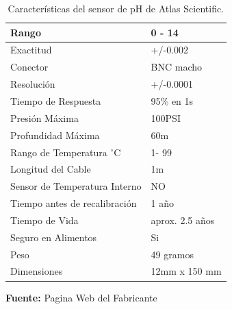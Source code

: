 \begin{table}[H]
\protect\caption[Características del sensor de pH de Atlas Scientific]{Características del sensor de pH de Atlas Scientific.}
\label{tab: caract_sondaph}
\begin{center}
\begin{tabular}{|l|l|}
\hline
Rango    &  0 - 14\\
\hline
Exactitud      &  +/-0.002\\
\hline
Conector &  BNC macho\\
\hline
Resolución   &  +/-0.0001\\
\hline
Tiempo de Respuesta   &  95\% en 1s\\
\hline
Presión Máxima    &  100PSI\\
\hline
Profundidad Máxima	& 60m\\
\hline
Rango de Temperatura $^{\circ}$C	& 1- 99\\
\hline
Longitud del Cable	& 1m\\
\hline
Sensor de Temperatura Interno	& NO\\
\hline
Tiempo antes de recalibración	& 1 año\\
\hline
Tiempo de Vida	& aprox. 2.5 años\\
\hline
Seguro en Alimentos & Si\\
\hline
Peso & 49 gramos\\
\hline
Dimensiones & 12mm x 150 mm\\
\hline
\end{tabular}
\vspace{5mm}
\newline
\hfill
\textbf{Fuente: }Pagina Web del Fabricante\cite{atlasph}
\end{center}
\end{table} 

